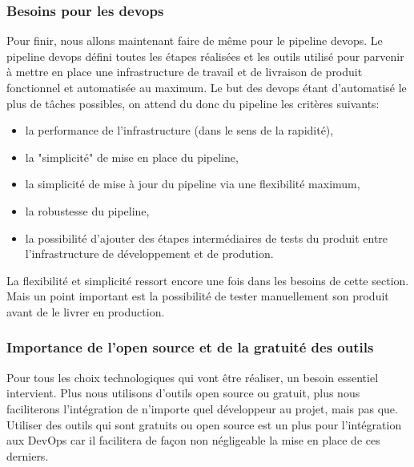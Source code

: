 \documentclass[
    iai, %
    il, %
]{heig-tb}
\begin{document}
\subsubsection{Besoins pour les \Gls{devops}}
Pour finir, nous allons maintenant faire de même pour le pipeline \Gls{devops}.
Le pipeline \Gls{devops} défini toutes les étapes réalisées et les outils utilisé pour parvenir à mettre en place une infrastructure de travail et de livraison de produit fonctionnel et automatisée au maximum.
Le but des \Gls{devops} étant d'automatisé le plus de tâches possibles, on attend du donc du pipeline les critères suivants:
\begin{itemize}
    \item la performance de l'infrastructure (dans le sens de la rapidité),
    \item la "simplicité" de mise en place du pipeline,
    \item la simplicité de mise à jour du pipeline via une flexibilité maximum,
    \item la robustesse du pipeline,
    \item la possibilité d'ajouter des étapes intermédiaires de tests du produit entre l'infrastructure de développement et de prodution.
\end{itemize}

La flexibilité et simplicité ressort encore une fois dans les besoins de cette section.
Mais un point important est la possibilité de tester manuellement son produit avant de le livrer en production.

\subsubsection{Importance de l'open source et de la gratuité des outils}
Pour tous les choix technologiques qui vont être réaliser, un besoin essentiel intervient.
Plus nous utilisons d'outils open source ou gratuit, plus nous faciliterons l'intégration de n'importe quel développeur au projet, mais pas que.
Utiliser des outils qui sont gratuits ou open source est un plus pour l'intégration aux DevOps car il facilitera de façon non négligeable la mise en place de ces derniers.

\end{document}

